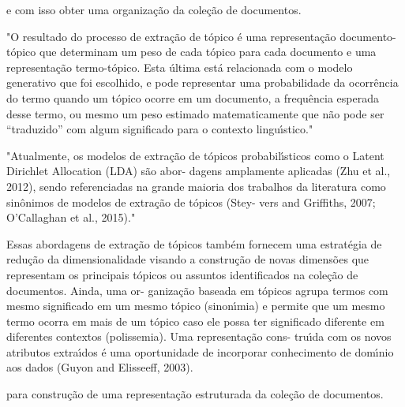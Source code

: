 e com isso obter uma organização da coleção de documentos.










"O resultado do processo de extração de tópico é uma representação documento-tópico que determinam um peso de cada tópico para cada documento e uma representação termo-tópico. Esta última está relacionada com o modelo generativo que foi escolhido, e pode representar uma probabilidade da ocorrência do termo quando um tópico ocorre em um documento, a frequência esperada desse termo, ou mesmo um peso estimado matematicamente que não pode ser “traduzido” com algum significado para o contexto linguı́stico."



"Atualmente, os modelos de extração de tópicos probabilı́sticos como o Latent Dirichlet Allocation (LDA) são abor- dagens amplamente aplicadas (Zhu et al., 2012), sendo referenciadas na grande maioria dos trabalhos da literatura como sinônimos de modelos de extração de tópicos (Stey- vers and Griffiths, 2007; O’Callaghan et al., 2015)."  


Essas abordagens de extração de tópicos também fornecem uma estratégia
de redução da dimensionalidade visando a construção de novas dimensões que representam
os principais tópicos ou assuntos identificados na coleção de documentos. Ainda, uma or-
ganização baseada em tópicos agrupa termos com mesmo significado em um mesmo tópico
(sinonı́mia) e permite que um mesmo termo ocorra em mais de um tópico caso ele possa
ter significado diferente em diferentes contextos (polissemia). Uma representação cons-
truı́da com os novos atributos extraı́dos é uma oportunidade de incorporar conhecimento
de domı́nio aos dados (Guyon and Elisseeff, 2003).


para construção de uma representação estruturada da coleção de documentos.





























